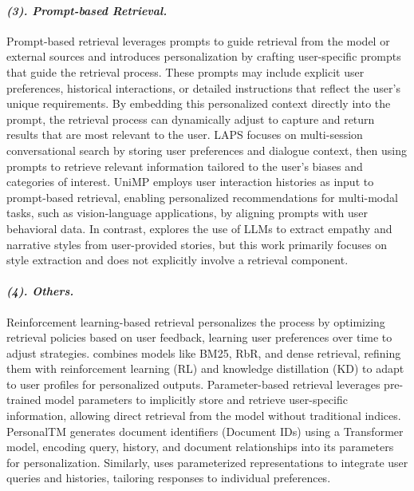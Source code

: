 \paragraph{\textbf{\textit{{(3). Prompt-based Retrieval.}}}}
Prompt-based retrieval leverages prompts to guide retrieval from the model or external sources and introduces personalization by crafting user-specific prompts that guide the retrieval process. These prompts may include explicit user preferences, historical interactions, or detailed instructions that reflect the user’s unique requirements. By embedding this personalized context directly into the prompt, the retrieval process can dynamically adjust to capture and return results that are most relevant to the user. LAPS \cite{joko2024doing} focuses on multi-session conversational search by storing user preferences and dialogue context, then using prompts to retrieve relevant information tailored to the user's biases and categories of interest. UniMP \cite{wei2024towards} employs user interaction histories as input to prompt-based retrieval, enabling personalized recommendations for multi-modal tasks, such as vision-language applications, by aligning prompts with user behavioral data. In contrast, \citet{shen2024heart} explores the use of LLMs to extract empathy and narrative styles from user-provided stories, but this work primarily focuses on style extraction and does not explicitly involve a retrieval component. 

\paragraph{\textbf{\textit{{(4). Others.}}}}
Reinforcement learning-based retrieval personalizes the process by optimizing retrieval policies based on user feedback, learning user preferences over time to adjust strategies. \citet{salemi2024optimization} combines models like BM25, RbR, and dense retrieval, refining them with reinforcement learning (RL) and knowledge distillation (KD) to adapt to user profiles for personalized outputs. Parameter-based retrieval leverages pre-trained model parameters to implicitly store and retrieve user-specific information, allowing direct retrieval from the model without traditional indices. PersonalTM \cite{lian2023personaltm} generates document identifiers (Document IDs) using a Transformer model, encoding query, history, and document relationships into its parameters for personalization. Similarly, \citet{zhang2024personalized} uses parameterized representations to integrate user queries and histories, tailoring responses to individual preferences.

